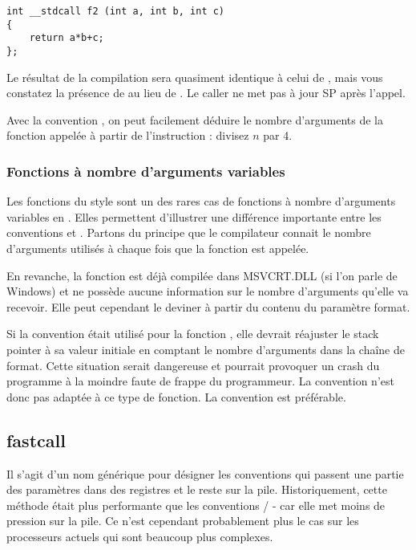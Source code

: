 \begin{lstlisting}[style=customc]
int __stdcall f2 (int a, int b, int c)
{
	return a*b+c;
};
\end{lstlisting}

Le résultat de la compilation sera quasiment identique à celui de , 
mais vous constatez la présence de  au lieu de .
Le \gls{caller} ne met pas à jour {SP} après l'appel.

Avec la convention , on peut facilement déduire le nombre d'arguments de la fonction 
appelée à partir de l'instruction : divisez $n$ par 4.



\subsubsection{Fonctions à nombre d'arguments variables}

Les fonctions du style \printf sont un des rares cas de fonctions à nombre d'arguments variables 
en \CCpp. Elles permettent d'illustrer une différence importante entre les conventions  et . 
Partons du principe que le compilateur connait le nombre d'arguments utilisés à chaque fois que la 
fonction \printf est appelée.

En revanche, la fonction \printf est déjà compilée dans MSVCRT.DLL (si l'on parle de Windows) et ne
possède aucune information sur le nombre d'arguments qu'elle va recevoir. Elle peut cependant le
deviner à partir du contenu du paramètre format.

Si la convention  était utilisé pour la fonction \printf, elle devrait réajuster le 
\gls{stack pointer} à sa valeur initiale en comptant le nombre d'arguments dans la chaîne de format.
Cette situation serait dangereuse et pourrait provoquer un crash du programme à la moindre faute de
frappe du programmeur.
La convention  n'est donc pas adaptée à ce type de fonction. La convention  est préférable.

\subsection{fastcall}
\label{fastcall}

Il s'agit d'un nom générique pour désigner les conventions qui passent une partie des paramètres dans
des registres et le reste sur la pile.
Historiquement, cette méthode était plus performante que les conventions / - 
car elle met moins de pression sur la pile. Ce n'est cependant probablement plus le cas sur les
processeurs actuels qui sont beaucoup plus complexes.

